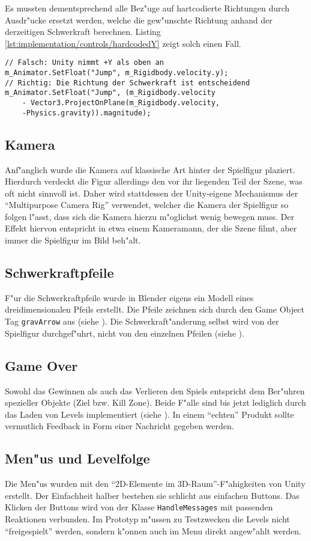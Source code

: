 Es mussten dementsprechend alle Bez"uge auf hartcodierte
Richtungen durch Ausdr"ucke ersetzt werden, welche die
gew"unschte Richtung anhand der derzeitigen Schwerkraft
berechnen. Listing
\ref{lst:implementation/controls/hardcodedY} zeigt solch
einen Fall.

\begin{lstlisting}[caption={Korrektur hartcodierter Richtungen},label=lst:implementation/controls/hardcodedY]
// Falsch: Unity nimmt +Y als oben an
m_Animator.SetFloat("Jump", m_Rigidbody.velocity.y);
// Richtig: Die Richtung der Schwerkraft ist entscheidend
m_Animator.SetFloat("Jump", (m_Rigidbody.velocity
    - Vector3.ProjectOnPlane(m_Rigidbody.velocity,
    -Physics.gravity)).magnitude);
\end{lstlisting}
%
\subsection{Kamera}
\label{sec:implementation/camera}
%
Anf"anglich wurde die Kamera auf klassische Art hinter
der Spielfigur plaziert. Hierdurch verdeckt die Figur
allerdings den vor ihr liegenden Teil der Szene, was
oft nicht sinnvoll ist. Daher wird stattdessen der
Unity-eigene Mechanismus der ``Multipurpose Camera Rig''
verwendet, welcher die Kamera der Spielfigur so folgen
l"asst, dass sich die Kamera hierzu m"oglichst wenig
bewegen muss. Der Effekt hiervon entspricht in etwa
einem Kameramann, der die Szene filmt, aber immer
die Spielfigur im Bild beh"alt.
%
\subsection{Schwerkraftpfeile}
\label{sec:implementation/arrows}
%
F"ur die Schwerkraftpfeile wurde in Blender eigens ein
Modell eines dreidimensionalen Pfeils erstellt. Die
Pfeile zeichnen sich durch den Game Object Tag
\texttt{gravArrow} aus (siehe ).
Die Schwerkraft"anderung selbst wird von der Spielfigur
durchgef"uhrt, nicht von den einzelnen Pfeilen
(siehe ).
%
\subsection{Game Over}
\label{sec:implementation/gameover}
Sowohl das Gewinnen als auch das Verlieren den Spiels
entspricht dem Ber"uhren spezieller Objekte (Ziel
bzw. Kill Zone). Beide F"alle sind bis jetzt lediglich
durch das Laden von Levels implementiert (siehe
). In einem
``echten'' Produkt sollte vermutlich Feedback in Form
einer Nachricht gegeben werden.
%
\subsection{Men"us und Levelfolge}
\label{sec:implementation/menus}
%
Die Men"us wurden mit den ``2D-Elemente im 3D-Raum''-F"ahigkeiten
von Unity erstellt. Der Einfachheit halber bestehen sie schlicht
aus einfachen Buttons. Das Klicken der Buttons wird von der
Klasse \texttt{HandleMessages} mit passenden Reaktionen verbunden.
Im Prototyp m"ussen zu Testzwecken die Levels nicht ``freigespielt''
werden, sondern k"onnen auch im Menu direkt angew"ahlt werden.
